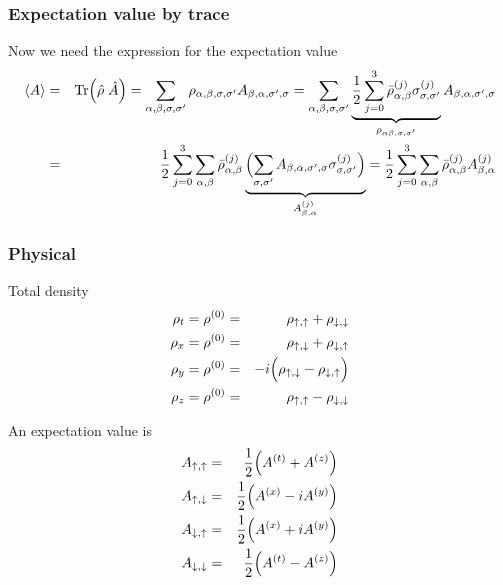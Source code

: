 \documentclass[11pt,a4paper]{report}
\begin{document}
\subsubsection{Expectation value by trace}

Now we need the expression for the expectation value
\begin{eqnarray*}
\langle{A}\rangle
&=&\mathrm{Tr}\Bigl(\hat{\rho}\;\hat{A}\Bigr)
=
\sum_{\alpha,\beta,\sigma,\sigma'}
\rho_{\alpha,\beta,\sigma,\sigma'} A_{\beta,\alpha,\sigma',\sigma}
=\sum_{\alpha,\beta,\sigma,\sigma'}
\underbrace{\frac{1}{2}\sum_{j=0}^3 
\bar{\rho}^{(j)}_{\alpha,\beta}
\sigma^{(j)}_{\sigma,\sigma'}}
_{\rho_{\alpha\beta,\sigma,\sigma'}} A_{\beta,\alpha,\sigma',\sigma}
\nonumber\\
&=&\frac{1}{2}
\sum_{j=0}^3 
\sum_{\alpha,\beta}
\bar{\rho}^{(j)}_{\alpha,\beta}
\underbrace{
\Bigl(
\sum_{\sigma,\sigma'}
A_{\beta,\alpha,\sigma',\sigma}\sigma^{(j)}_{\sigma,\sigma'}\Bigr)}
_{A^{(j)}_{\beta,\alpha}}
=\frac{1}{2}
\sum_{j=0}^3 
\sum_{\alpha,\beta}
\bar{\rho}^{(j)}_{\alpha,\beta}A^{(j)}_{\beta,\alpha}
\end{eqnarray*}

\subsubsection{Physical}
Total density
\begin{eqnarray}
\rho_t=\rho^{(0)}&=&\rho_{\uparrow,\uparrow}+\rho_{\downarrow,\downarrow}
\\
\rho_x=\rho^{(0)}&=&\rho_{\uparrow,\downarrow}+\rho_{\downarrow,\uparrow}
\\
\rho_y=\rho^{(0)}&=&-i\Bigl(\rho_{\uparrow,\downarrow}-\rho_{\downarrow,\uparrow}\Bigr)
\\
\rho_z=\rho^{(0)}&=&\rho_{\uparrow,\uparrow}-\rho_{\downarrow,\downarrow}
\end{eqnarray}

An expectation value is
\begin{eqnarray}
A_{\uparrow,\uparrow}&=&\frac{1}{2}\Bigl(A^{(t)}+A^{(z)}\Bigr)
\nonumber\\
A_{\uparrow,\downarrow}&=&\frac{1}{2}\Bigl(A^{(x)}-iA^{(y)}\Bigr)
\nonumber\\
A_{\downarrow,\uparrow}&=&\frac{1}{2}\Bigl(A^{(x)}+iA^{(y)}\Bigr)
\nonumber\\
A_{\downarrow,\downarrow}&=&\frac{1}{2}\Bigl(A^{(t)}-A^{(z)}\Bigr)
\end{eqnarray}
\end{document}
